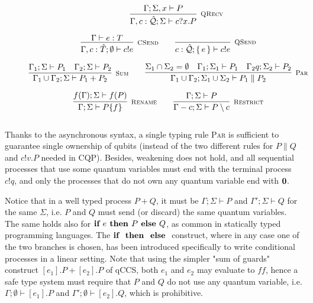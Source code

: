 \begin{figure}[h!]
\begin{gather*}
\qquad
\infer[\mbox{\footnotesize\scshape QRecv}]
{\Gamma, c : \hat{\mathcal{Q}}; \Sigma \vdash c?x . P}
{ \Gamma; \Sigma, x \vdash P} 
\\[0.2cm]
\infer[\mbox{\footnotesize\scshape CSend}]{\Gamma, c : \hat{T}; \emptyset \vdash c!e}{ \Gamma \vdash e : T} \qquad
\infer[\mbox{\footnotesize\scshape QSend}]{c : \hat{\mathcal{Q}} ; \set{e} \vdash c!e}{} \\[0.2cm]
\infer[\mbox{\footnotesize\scshape Sum}]{\Gamma_1 \cup \Gamma_2; \Sigma \vdash P_1 + P_2}{\Gamma_1; \Sigma \vdash P_1 & \Gamma_2; \Sigma \vdash P_2} \qquad 
\infer[\mbox{\footnotesize\scshape Par}]{\Gamma_1 \cup \Gamma_2; \Sigma_1 \cup \Sigma_2 \vdash P_1 \parallel P_2}
{\Sigma_1 \cap \Sigma_2 = \emptyset & \Gamma_1; \Sigma_1 \vdash P_1 & \Gamma_2 q; \Sigma_2 \vdash P_2} \\[0.2cm]
\infer[\mbox{\footnotesize\scshape Rename}]{\Gamma; \Sigma \vdash P \{f\}}{f(\Gamma); \Sigma \vdash f(P)} \qquad
\infer[\mbox{\footnotesize\scshape Restrict}]{\Gamma - c; \Sigma \vdash P \setminus c}{\Gamma; \Sigma \vdash P} \\[0.3cm]
\end{gather*}
\end{figure}

Thanks to the asynchronous syntax, a single typing rule {\scshape Par} is sufficient to guarantee single ownership of qubits (instead of the two different rules for $P \parallel Q$ and $c!v.P$ needed in CQP). Besides, weakening does not hold, and all sequential processes that use some quantum variables must end with the terminal process $c!q$, and only the processes that do not own any quantum variable end with $\mathbf{0}$. 

Notice that in a well typed process $P + Q$, it must be $\Gamma; \Sigma \vdash P$ and $\Gamma'; \Sigma \vdash Q$ for the same $\Sigma$, i.e. $P$ and $Q$ must send (or discard) the same quantum variables. The same holds also for $\textbf{if } e \textbf{ then } P \textbf{ else } Q$, as common in statically typed programming languages. The $\textbf{if }  \textbf{ then }  \textbf{ else }$ construct, where in any case one of the two branches is chosen, has been introduced specifically to write conditional processes in a linear setting. Note that using the simpler "sum of guards" construct $[e_1].P + [e_2].P$ of qCCS, both $e_1$ and $e_2$ may evaluate to $ff$, hence a safe type system must require that $P$ and $Q$ do not use any quantum variable, i.e.  $\Gamma; \emptyset \vdash [e_1].P$ and $\Gamma'; \emptyset \vdash [e_2].Q$, which is prohibitive.  

